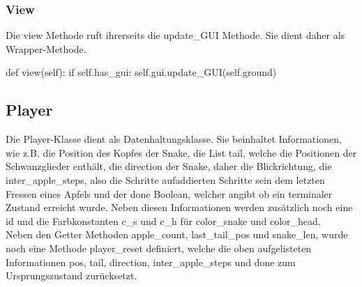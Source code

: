 \subsubsection{View} \label{sec:Implementierung-View}
Die view Methode ruft ihrerseits die update\_GUI Methode. Sie dient daher als Wrapper-Methode.
\begin{python}
	def view(self):
		if self.has_gui:
			self.gui.update_GUI(self.ground)
\end{python}


\subsection{Player} \label{sec:Implementierung_Player}
Die Player-Klasse dient als Datenhaltungsklasse. Sie beinhaltet Informationen, wie z.B. die Position des Kopfes der Snake, die List tail, welche die Positionen der Schwanzglieder enthält, die direction der Snake, daher die Blickrichtung, die inter\_apple\_steps, also die Schritte aufaddierten Schritte sein dem letzten Fressen eines Apfels und der done Boolean, welcher angibt ob ein terminaler Zustand erreicht wurde. Neben diesen Informationen werden zusätzlich noch eine id und die Farbkonstanten c\_s und c\_h für color\_snake und color\_head.\\
Neben den Getter Methoden apple\_count, last\_tail\_pos und snake\_len, wurde noch eine Methode player\_reset definiert, welche die oben aufgelisteten Informationen pos, tail, direction, inter\_apple\_steps und done zum Ursprungszustand zurücksetzt.

